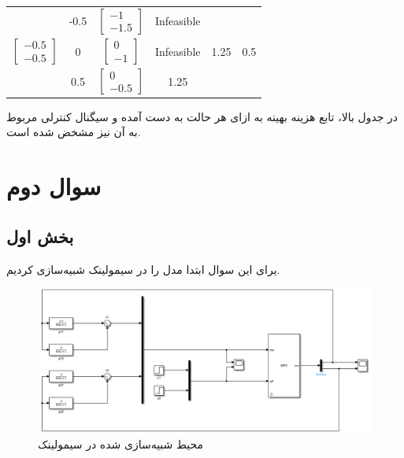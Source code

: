 \documentclass[14pt, a4paper]{extarticle}
\begin{document}
\begin{latin}
\begin{longtable}{|c|c|c|c|c|c|}
			& -0.5 &$\begin{bmatrix} -1 \\ -1.5 \end{bmatrix}$      & Infeasible                        &            &        \\ \cline{2-4}
			\multirow{-3}{*}{$\begin{bmatrix} -0.5 \\ -0.5 \end{bmatrix}$}& 0   &$\begin{bmatrix} 0 \\ -1 \end{bmatrix}$      & Infeasible                        &    1.25       &  0.5	      \\ \cline{2-4}
			& 0.5 &$\begin{bmatrix} 0 \\ -0.5 \end{bmatrix}$      &    1.25                    &                &      \\ \hline
			
		\end{longtable}
	\end{latin}
در جدول بالا، تابع هزینه بهینه به ازای هر حالت به دست آمده و سیگنال کنترلی مربوط به آن نیز مشخض شده است.
	
\newpage
\section{سوال دوم}
\subsection{بخش اول}
یرای این سوال ابتدا مدل را در سیمولینک شبیه‌سازی کردیم.\\
	\begin{figure}[h!]
		\centering
		\includegraphics[scale = 0.5]{Q2_sim_layout.png}
		\caption{محیط شبیه‌سازی شده در سیمولینک}
	\end{figure}
\end{document}

